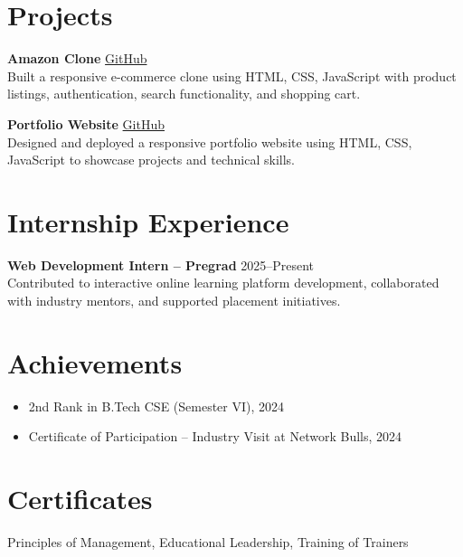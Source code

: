 \documentclass[11pt,a4paper]{article}   %
\begin{document}
\section*{Projects}
\textbf{Amazon Clone} \quad \href{https://github.com/Amazon-Clone-Project}{GitHub} \\
Built a responsive e-commerce clone using HTML, CSS, JavaScript with product listings, authentication, search functionality, and shopping cart.

\textbf{Portfolio Website} \quad \href{https://github.com/Portfolio-Website}{GitHub} \\
Designed and deployed a responsive portfolio website using HTML, CSS, JavaScript to showcase projects and technical skills.

\section*{Internship Experience}
\textbf{Web Development Intern – Pregrad} \hfill 2025--Present \\
Contributed to interactive online learning platform development, collaborated with industry mentors, and supported placement initiatives.

\section*{Achievements}
\begin{itemize}[leftmargin=*]
  \item 2nd Rank in B.Tech CSE (Semester VI), 2024
  \item Certificate of Participation – Industry Visit at Network Bulls, 2024
\end{itemize}

\section*{Certificates}
Principles of Management, Educational Leadership, Training of Trainers
\end{document}
